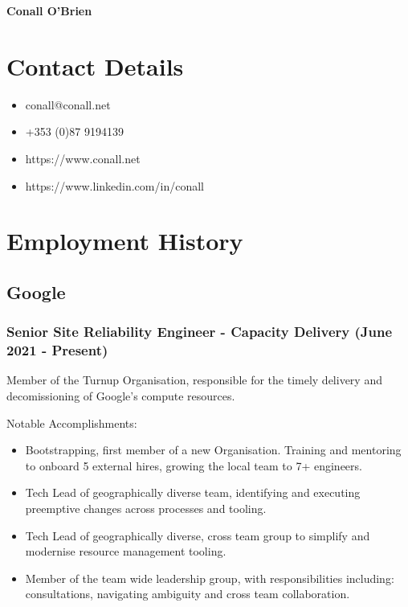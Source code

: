 \documentclass[a4paper, 10pt] {article}
\begin{document}
\begingroup
  \centering
  \LARGE \textbf{Conall O'Brien}\\[1.5em]
\endgroup

\hrulefill

\section*{Contact Details}

\begin{itemize}[itemsep=2pt,parsep=2pt]
 \item conall@conall.net
 \item +353 (0)87 9194139
 \item https://www.conall.net
 \item https://www.linkedin.com/in/conall
\end{itemize}

\hrulefill

\section*{Employment History}

\subsection*{Google}

\subsubsection*{Senior Site Reliability Engineer - Capacity Delivery (June 2021 - Present)}

Member of the Turnup Organisation, responsible for the timely delivery and
decomissioning of Google's compute resources.

\vspace{4mm}  %

Notable Accomplishments:

\begin{itemize}[itemsep=2pt,parsep=2pt]
  \item Bootstrapping, first member of a new Organisation. Training and mentoring to onboard 5 external hires, growing the local team to 7+ engineers.
  \item Tech Lead of geographically diverse team, identifying and executing preemptive changes across processes and tooling.
  \item Tech Lead of geographically diverse, cross team group to simplify and modernise resource management tooling.
  \item Member of the team wide leadership group, with responsibilities including: consultations, navigating ambiguity and cross team collaboration.
\end{itemize}
\end{document}
